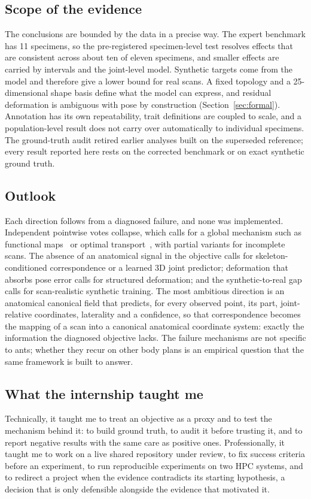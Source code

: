 \subsection{Scope of the evidence}

The conclusions are bounded by the data in a precise way. The expert benchmark
has 11 specimens, so the pre-registered specimen-level test resolves effects
that are consistent across about ten of eleven specimens, and smaller effects
are carried by intervals and the joint-level model. Synthetic targets come from
the model and therefore give a lower bound for real scans. A fixed topology and a
25-dimensional shape basis define what the model can express, and residual
deformation is ambiguous with pose by construction (Section~\ref{sec:formal}).
Annotation has its own repeatability, trait definitions are coupled to scale,
and a population-level result does not carry over automatically to individual
specimens. The ground-truth audit retired earlier analyses built on the
superseded reference; every result reported here rests on the corrected
benchmark or on exact synthetic ground truth.

\subsection{Outlook}

Each direction follows from a diagnosed failure, and none was implemented.
Independent pointwise votes collapse, which calls for a global mechanism such
as functional maps~\cite{fmaps} or optimal transport~\cite{ot}, with partial
variants for incomplete scans. The absence of an anatomical signal in the
objective calls for skeleton-conditioned correspondence or a learned 3D joint
predictor; deformation that absorbs pose error calls for structured deformation;
and the synthetic-to-real gap calls for scan-realistic synthetic training. The
most ambitious direction is an anatomical canonical field that predicts, for
every observed point, its part, joint-relative coordinates, laterality and a
confidence, so that correspondence becomes the mapping of a scan into a
canonical anatomical coordinate system: exactly the information the diagnosed
objective lacks. The failure mechanisms are not specific to ants; whether they
recur on other body plans is an empirical question that the same framework is
built to answer.

\subsection{What the internship taught me}

Technically, it taught me to treat an objective as a proxy and to test the
mechanism behind it: to build ground truth, to audit it before trusting it, and
to report negative results with the same care as positive ones. Professionally,
it taught me to work on a live shared repository under review, to fix success
criteria before an experiment, to run reproducible experiments on two HPC
systems, and to redirect a project when the evidence contradicts its starting
hypothesis, a decision that is only defensible alongside the evidence that
motivated it.
